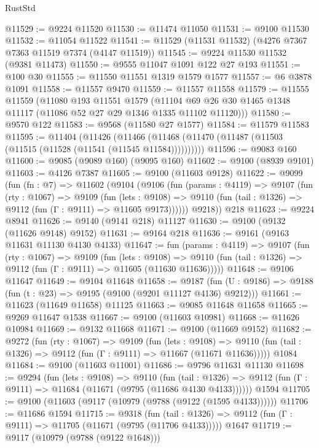 \begin{lexlean}{RustStd}
\begin{coremodule}
@11529 := @9224 @11520
@11530 := @11474 @11050
@11531 := @9100 @11530
@11532 := @11054 @11522
@11541 := @11529 (@11531 @11532) (@4276 @7367 @7363 @11519 @7374 (@4147 @11519))
@11545 := @9224 @11530 @11532 (@9381 @11473)
@11550 := @9555 @11047 @1091 @122 @27 @193
@11551 := @100 @30
@11555 := @11550 @11551 @1319 @1579 @1577
@11557 := @6 @3878 @1091
@11558 := @11557 @9470
@11559 := @11557 @11558
@11579 := @11555
    @11559
    (@11080
      @193
      @11551
      @1579
      (@11104 @69 @26 @30 @1465 @1348 @11117 (@11086 @52 @27 @29 @1346 @1335 @11102 @11120)))
@11580 := @9570 @122
@11583 := @9568 (@11580 @27 @1577)
@11584 := @11579 @11583
@11595 := @11404
    (@11426 (@11466 (@11468 (@11470 (@11487 (@11503 (@11515 (@11528 (@11541 (@11545 @11584))))))))))
@11596 := @9083 @160
@11600 := @9085 (@9089 @160) (@9095 @160)
@11602 := @9100 (@8939 @9101)
@11603 := @4126 @7387
@11605 := @9100 (@11603 @9128)
@11622 := @9099
    (fun (fn : @7) =>
    @11602
      (@9104
        (@9106
          (fun (params : @4119) =>
          @9107
            (fun (rty : @1067) =>
            @9109
              (fun (lets : @9108) =>
              @9110 (fun (tail : @1326) => @9112 (fun (Γ : @9111) => @11605 @9173))))))
        @9218))
    @218
@11623 := @9224 @8941
@11626 := @9140 (@9141 @218) @11127
@11630 := @9100 (@9132 (@11626 @9148) @9152)
@11631 := @9164 @218
@11636 := @9161 (@9163 @11631 @11130 @4130 @4133)
@11647 := fun (params : @4119) =>
  @9107
    (fun (rty : @1067) =>
    @9109
      (fun (lets : @9108) =>
      @9110 (fun (tail : @1326) => @9112 (fun (Γ : @9111) => @11605 (@11630 @11636)))))
@11648 := @9106 @11647
@11649 := @9104 @11648
@11658 := @9187
    (fun (U : @9186) => @9188 (fun (t : @23) => @9195 (@9100 (@9201 @11127 @4136) @9212)))
@11661 := @11623 (@11649 @11658) @11125
@11663 := @9085 @11648 @11658
@11665 := @9269 @11647 @1538
@11667 := @9100 (@11603 @10981)
@11668 := @11626 @10984
@11669 := @9132 @11668
@11671 := @9100 (@11669 @9152)
@11682 := @9272
    (fun (rty : @1067) =>
    @9109
      (fun (lets : @9108) =>
      @9110 (fun (tail : @1326) => @9112 (fun (Γ : @9111) => @11667 (@11671 @11636)))))
    @1084
@11684 := @9100 (@11603 @11001)
@11686 := @9796 @11631 @11130
@11698 := @9294
    (fun (lets : @9108) =>
    @9110
      (fun (tail : @1326) =>
      @9112 (fun (Γ : @9111) => @11684 (@11671 (@9795 (@11686 @4130 @4133))))))
    @1594
@11705 := @9100 (@11603 (@9117 (@10979 (@9788 (@9122 (@1595 @4133))))))
@11706 := @11686 @1594
@11715 := @9318
    (fun (tail : @1326) => @9112 (fun (Γ : @9111) => @11705 (@11671 (@9795 (@11706 @4133)))))
    @1647
@11719 := @9117 (@10979 (@9788 (@9122 @1648)))

\end{coremodule}
\end{lexlean}
